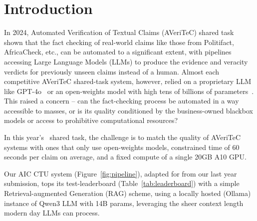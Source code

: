 


\section{Introduction}
\label{sec:introduction}
In 2024, Automated Verification of Textual Claims (AVeriTeC) shared task~\cite{schlichtkrull-etal-2024-automated} shown that the fact checking of real-world claims like those from Politifact, AfricaCheck, etc., can be automated to a significant extent, with pipelines accessing Large Language Models (LLMs) to produce the evidence and veracity verdicts for previously unseen claims instead of a human.
Almost each competitive AVeriTeC shared-task system, however, relied on a proprietary LLM like GPT-4o~\cite{rothermel-etal-2024-infact,ullrich-etal-2024-aic} or an open-weights model with high tens of billions of parameters~\cite{yoon-etal-2024-hero}.
This raised a concern -- can the fact-checking process be automated in a way accessible to masses, or is its quality conditioned by the business-owned blackbox models or access to prohibitive computational resources?

In this year's~\averitec{} shared task, the challenge is to match the quality of AVeriTeC systems with ones that only use open-weights models, constrained time of 60 seconds per claim on average, and a fixed compute of a single 20GB A10 GPU.

Our AIC CTU system (Figure~\ref{fig:pipeline}), adapted for \averitec{} from our last year submission, tops its test-leaderboard (Table~\ref{tab:leaderboard}) with a simple Retrieval-augmented Generation (RAG) scheme, using a locally hosted (Ollama) instance of Qwen3 LLM with 14B params, leveraging the sheer context length modern day LLMs can process.

